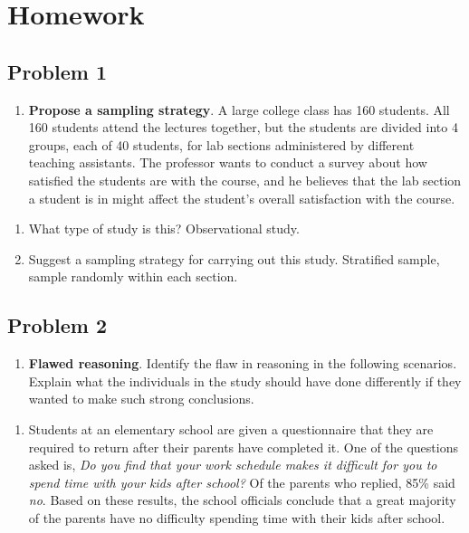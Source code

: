\documentclass[
]{book}
\providecommand{\tightlist}{%
  \setlength{\itemsep}{0pt}\setlength{\parskip}{0pt}}
\begin{document}
\hypertarget{homework-3}{%
\section{Homework}\label{homework-3}}

\hypertarget{problem-1-3}{%
\subsection{Problem 1}\label{problem-1-3}}

\begin{enumerate}
\def\labelenumi{\arabic{enumi}.}
\tightlist
\item
  \textbf{Propose a sampling strategy}. A large college class has 160 students. All 160 students attend the lectures together, but the students are divided into 4 groups, each of 40 students, for lab sections administered by different teaching assistants. The professor wants to conduct a survey about how satisfied the students are with the course, and he believes that the lab section a student is in might affect the student's overall satisfaction with the course.
\end{enumerate}

\begin{enumerate}
\def\labelenumi{\alph{enumi}.}
\tightlist
\item
  What type of study is this? Observational study.
\item
  Suggest a sampling strategy for carrying out this study. Stratified sample, sample randomly within each section.
\end{enumerate}

\hypertarget{problem-2-3}{%
\subsection{Problem 2}\label{problem-2-3}}

\begin{enumerate}
\def\labelenumi{\arabic{enumi}.}
\setcounter{enumi}{1}
\tightlist
\item
  \textbf{Flawed reasoning}. Identify the flaw in reasoning in the following scenarios. Explain what the individuals in the study should have done differently if they wanted to make such strong conclusions.
\end{enumerate}

\begin{enumerate}
\def\labelenumi{\alph{enumi}.}
\tightlist
\item
  Students at an elementary school are given a questionnaire that they are required to return after their parents have completed it. One of the questions asked is, \emph{Do you find that your work schedule makes it difficult for you to spend time with your kids after school?} Of the parents who replied, 85\% said \emph{no}. Based on these results, the school officials conclude that a great majority of the parents have no difficulty spending time with their kids after school.
\end{enumerate}
\end{document}
